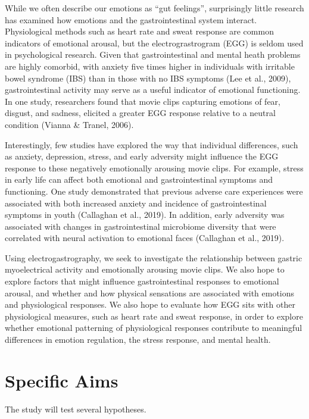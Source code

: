 \documentclass[]{book}
\begin{document}
While we often describe our emotions as ``gut feelings'', surprisingly little research has examined how emotions and the gastrointestinal system interact. Physiological methods such as heart rate and sweat response are common indicators of emotional arousal, but the electrograstrogram (EGG) is seldom used in psychological research. Given that gastrointestinal and mental heath problems are highly comorbid, with anxiety five times higher in individuals with irritable bowel syndrome (IBS) than in those with no IBS symptoms (Lee et al., 2009), gastrointestinal activity may serve as a useful indicator of emotional functioning. In one study, researchers found that movie clips capturing emotions of fear, disgust, and sadness, elicited a greater EGG response relative to a neutral condition (Vianna \& Tranel, 2006).

Interestingly, few studies have explored the way that individual differences, such as anxiety, depression, stress, and early adversity might influence the EGG response to these negatively emotionally arousing movie clips. For example, stress in early life can affect both emotional and gastrointestinal symptoms and functioning. One study demonstrated that previous adverse care experiences were associated with both increased anxiety and incidence of gastrointestinal symptoms in youth (Callaghan et al., 2019). In addition, early adversity was associated with changes in gastrointestinal microbiome diversity that were correlated with neural activation to emotional faces (Callaghan et al., 2019).

Using electrogastrography, we seek to investigate the relationship between gastric myoelectrical activity and emotionally arousing movie clips. We also hope to explore factors that might influence gastrointestinal responses to emotional arousal, and whether and how physical sensations are associated with emotions and physiological responses. We also hope to evaluate how EGG sits with other physiological measures, such as heart rate and sweat response, in order to explore whether emotional patterning of physiological responses contribute to meaningful differences in emotion regulation, the stress response, and mental health.

\hypertarget{specific-aims}{%
\section{Specific Aims}\label{specific-aims}}

The study will test several hypotheses.
\end{document}
